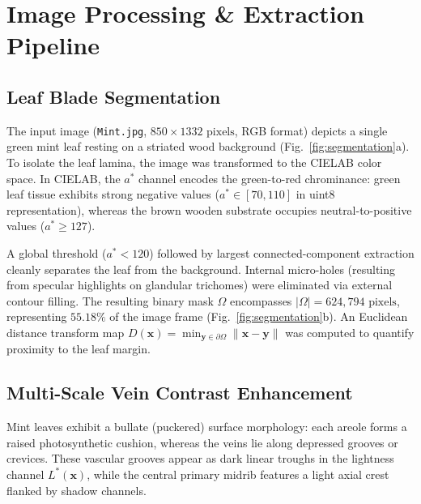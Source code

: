 \documentclass[10pt,twocolumn]{article}
\begin{document}
\section{Image Processing \& Extraction Pipeline}
\label{sec:methods}

\subsection{Leaf Blade Segmentation}
The input image (\texttt{Mint.jpg}, $850 \times 1332\text{ pixels}$, RGB format) depicts a single green mint leaf resting on a striated wood background (Fig.~\ref{fig:segmentation}a). To isolate the leaf lamina, the image was transformed to the CIELAB color space. In CIELAB, the $a^*$ channel encodes the green-to-red chrominance: green leaf tissue exhibits strong negative values ($a^* \in [70, 110]$ in uint8 representation), whereas the brown wooden substrate occupies neutral-to-positive values ($a^* \ge 127$).

A global threshold ($a^* < 120$) followed by largest connected-component extraction cleanly separates the leaf from the background. Internal micro-holes (resulting from specular highlights on glandular trichomes) were eliminated via external contour filling. The resulting binary mask $\Omega$ encompasses $|\Omega| = 624,794\text{ pixels}$, representing $55.18\%$ of the image frame (Fig.~\ref{fig:segmentation}b). An Euclidean distance transform map $D(\mathbf{x}) = \min_{\mathbf{y} \in \partial \Omega} \|\mathbf{x} - \mathbf{y}\|$ was computed to quantify proximity to the leaf margin.

\subsection{Multi-Scale Vein Contrast Enhancement}
Mint leaves exhibit a bullate (puckered) surface morphology: each areole forms a raised photosynthetic cushion, whereas the veins lie along depressed grooves or crevices. These vascular grooves appear as dark linear troughs in the lightness channel $L^*(\mathbf{x})$, while the central primary midrib features a light axial crest flanked by shadow channels.
\end{document}
